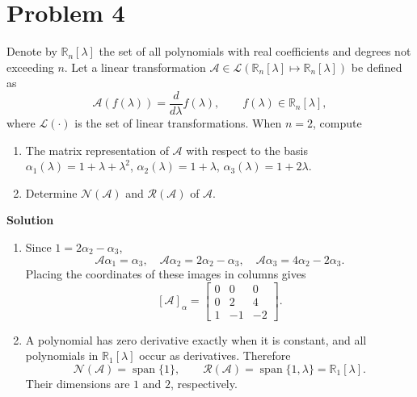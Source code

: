 \documentclass[UTF8,10pt,letterpaper,fontset=fandol]{ctexart}
\newcommand{\R}{\mathbb R}
\newcommand{\Span}{\operatorname{span}}
\newcommand{\Solution}{\par\Needspace{5\baselineskip}\textbf{Solution}\par}
\begin{document}
\section{Problem 4}
Denote by \(\R_n[\lambda]\) the set of all polynomials with real coefficients and degrees
not exceeding \(n\). Let a linear transformation
\(\mathcal A\in\mathcal L(\R_n[\lambda]\mapsto\R_n[\lambda])\) be defined as
\[
\mathcal A(f(\lambda))=\frac{d}{d\lambda}f(\lambda),\qquad f(\lambda)\in\R_n[\lambda],
\]
where \(\mathcal L(\cdot)\) is the set of linear transformations. When \(n=2\), compute
\begin{enumerate}
\item The matrix representation of \(\mathcal A\) with respect to the basis
\(\alpha_1(\lambda)=1+\lambda+\lambda^2\), \(\alpha_2(\lambda)=1+\lambda\),
\(\alpha_3(\lambda)=1+2\lambda\).
\item Determine \(\mathcal N(\mathcal A)\) and \(\mathcal R(\mathcal A)\) of \(\mathcal A\).
\end{enumerate}

\Solution
\begin{enumerate}
\item Since \(1=2\alpha_2-\alpha_3\),
\[
\mathcal A\alpha_1=\alpha_3,\quad
\mathcal A\alpha_2=2\alpha_2-\alpha_3,\quad
\mathcal A\alpha_3=4\alpha_2-2\alpha_3.
\]
Placing the coordinates of these images in columns gives
\[
\boxed{[\mathcal A]_{\alpha}=\begin{bmatrix}0&0&0\\0&2&4\\1&-1&-2\end{bmatrix}}.
\]
\item A polynomial has zero derivative exactly when it is constant, and all polynomials
in \(\R_1[\lambda]\) occur as derivatives. Therefore
\[
\boxed{\mathcal N(\mathcal A)=\Span\{1\}},\qquad
\boxed{\mathcal R(\mathcal A)=\Span\{1,\lambda\}=\R_1[\lambda]}.
\]
Their dimensions are \(1\) and \(2\), respectively.
\end{enumerate}
\end{document}
